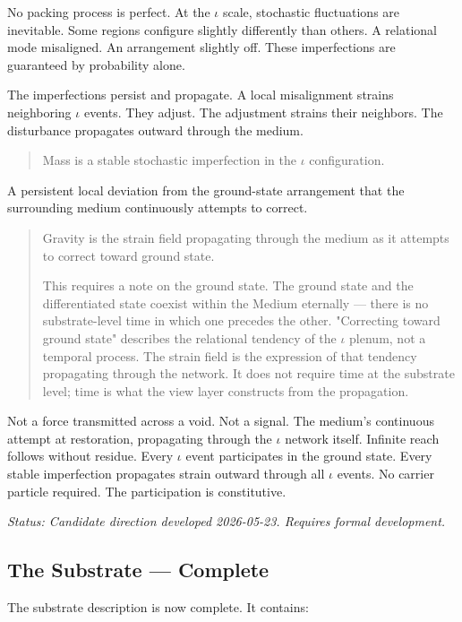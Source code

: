 \documentclass[11pt,letterpaper]{article}
\begin{document}
No packing process is perfect. At the \(\iota\) scale, stochastic fluctuations are inevitable. Some regions configure slightly differently than others. A relational mode misaligned. An arrangement slightly off. These imperfections are guaranteed by probability alone.

The imperfections persist and propagate. A local misalignment strains neighboring \(\iota\) events. They adjust. The adjustment strains their neighbors. The disturbance propagates outward through the medium.

\begin{quote}
Mass is a stable stochastic imperfection in the \(\iota\) configuration.
\end{quote}

A persistent local deviation from the ground-state arrangement that the surrounding medium continuously attempts to correct.

\begin{quote}
Gravity is the strain field propagating through the medium as it attempts to correct toward ground state.

This requires a note on the ground state. The ground state and the differentiated state coexist within the Medium eternally --- there is no substrate-level time in which one precedes the other. "Correcting toward ground state" describes the relational tendency of the \(\iota\) plenum, not a temporal process. The strain field is the expression of that tendency propagating through the network. It does not require time at the substrate level; time is what the view layer constructs from the propagation.
\end{quote}

Not a force transmitted across a void. Not a signal. The medium's continuous attempt at restoration, propagating through the \(\iota\) network itself. Infinite reach follows without residue. Every \(\iota\) event participates in the ground state. Every stable imperfection propagates strain outward through all \(\iota\) events. No carrier particle required. The participation is constitutive.

\emph{Status: Candidate direction developed 2026-05-23. Requires formal development.}

\subsection{The Substrate --- Complete}
\label{sec:org6604e5d}

The substrate description is now complete. It contains:
\end{document}
